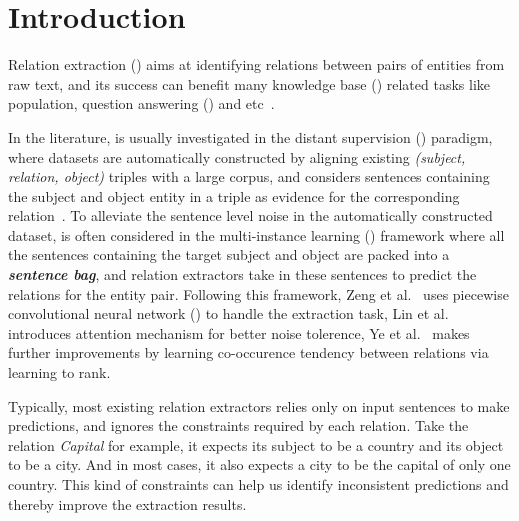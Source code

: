 \section{Introduction}

Relation extraction (\RE) aims at identifying relations between pairs of entities from raw text, and its success can benefit  many knowledge base (\KB) related tasks like \KB population, question answering (\QA) and etc~\cite{suchanek2013advances}.

In the literature, \RE is usually investigated in the distant supervision (\DS) paradigm, where datasets are automatically constructed by aligning existing \KB \emph{(subject, relation, object)} triples with a large corpus, and considers sentences containing the subject and object entity in a triple as evidence for the corresponding relation~\cite{riedel2010modeling}.
To alleviate the sentence level noise in the automatically constructed dataset, \RE is often considered in the multi-instance learning (\MIL) framework where all the sentences containing the target subject and object are packed into a \textbf{\emph{sentence bag}}, and relation extractors take in these sentences to predict the relations for the entity pair. 
Following this framework, Zeng et al.~ uses piecewise convolutional neural network (\PCNN) to handle the extraction task, Lin et al.~ introduces attention mechanism for better noise tolerence,
Ye et al.~ makes further improvements by learning co-occurence tendency between relations via learning to rank.

Typically, most existing relation extractors relies only on input sentences to make predictions, and ignores the constraints required by each relation.
Take the relation \emph{Capital} for example, it expects its subject to be a country and its object to be a city.
And in most cases, it also expects a city to be the capital of only one country.
This kind of constraints can help us identify inconsistent predictions and thereby improve the extraction results.

